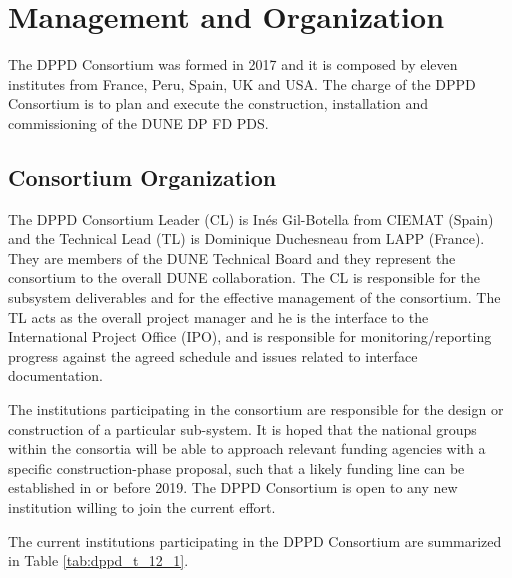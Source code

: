 \section{Management and Organization}
\label{sec:fddp-pd-12}

The DPPD Consortium was formed in 2017 and it is composed by eleven institutes from France, Peru, Spain, UK and USA. The charge of the DPPD Consortium is to plan and execute the construction, installation and commissioning of the DUNE DP FD PDS.

\subsection{Consortium Organization}
\label{sec:fddp-pd-12.1}

The DPPD Consortium Leader (CL) is In\'{e}s Gil-Botella from CIEMAT (Spain) and the Technical Lead (TL) is Dominique Duchesneau from LAPP (France). They are members of the DUNE Technical Board and they represent the consortium to the overall DUNE collaboration. The CL is responsible for the subsystem deliverables and for the effective management of the consortium. The TL acts as the overall project manager and he is the interface to the International Project Office (IPO), and is responsible for monitoring/reporting progress against the agreed schedule and issues related to interface documentation.

The institutions participating in the consortium are responsible for the design or construction of a particular sub-system. It is hoped that the national groups within the consortia will be able to approach relevant funding agencies with a specific construction-phase proposal, such that a likely funding line can be established in or before 2019. The DPPD Consortium is open to any new institution willing to join the current effort.

The current institutions participating in the DPPD Consortium are summarized in Table \ref{tab:dppd_t_12_1}.


